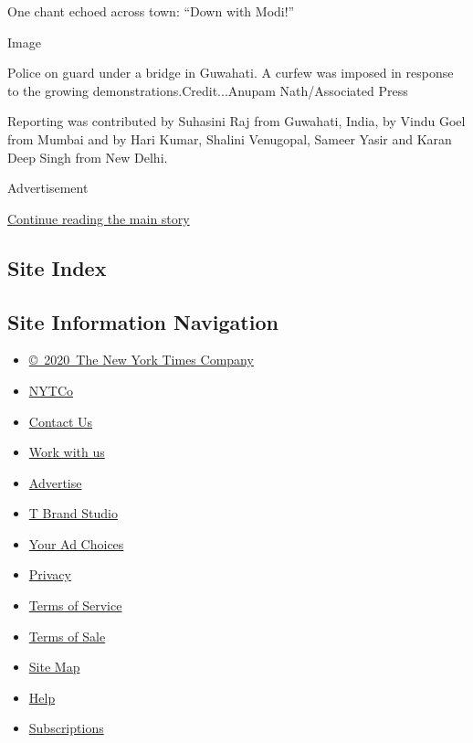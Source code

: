 One chant echoed across town: ``Down with Modi!''

Image

Police on guard under a bridge in Guwahati. A curfew was imposed in
response to the growing demonstrations.Credit...Anupam Nath/Associated
Press

Reporting was contributed by Suhasini Raj from Guwahati, India, by Vindu
Goel from Mumbai and by Hari Kumar, Shalini Venugopal, Sameer Yasir and
Karan Deep Singh from New Delhi.

Advertisement

\protect\hyperlink{after-bottom}{Continue reading the main story}

\hypertarget{site-index}{%
\subsection{Site Index}\label{site-index}}

\hypertarget{site-information-navigation}{%
\subsection{Site Information
Navigation}\label{site-information-navigation}}

\begin{itemize}
\tightlist
\item
  \href{https://help.nytimes.com/hc/en-us/articles/115014792127-Copyright-notice}{©~2020~The
  New York Times Company}
\end{itemize}

\begin{itemize}
\tightlist
\item
  \href{https://www.nytco.com/}{NYTCo}
\item
  \href{https://help.nytimes.com/hc/en-us/articles/115015385887-Contact-Us}{Contact
  Us}
\item
  \href{https://www.nytco.com/careers/}{Work with us}
\item
  \href{https://nytmediakit.com/}{Advertise}
\item
  \href{http://www.tbrandstudio.com/}{T Brand Studio}
\item
  \href{https://www.nytimes.com/privacy/cookie-policy\#how-do-i-manage-trackers}{Your
  Ad Choices}
\item
  \href{https://www.nytimes.com/privacy}{Privacy}
\item
  \href{https://help.nytimes.com/hc/en-us/articles/115014893428-Terms-of-service}{Terms
  of Service}
\item
  \href{https://help.nytimes.com/hc/en-us/articles/115014893968-Terms-of-sale}{Terms
  of Sale}
\item
  \href{https://spiderbites.nytimes.com}{Site Map}
\item
  \href{https://help.nytimes.com/hc/en-us}{Help}
\item
  \href{https://www.nytimes.com/subscription?campaignId=37WXW}{Subscriptions}
\end{itemize}
